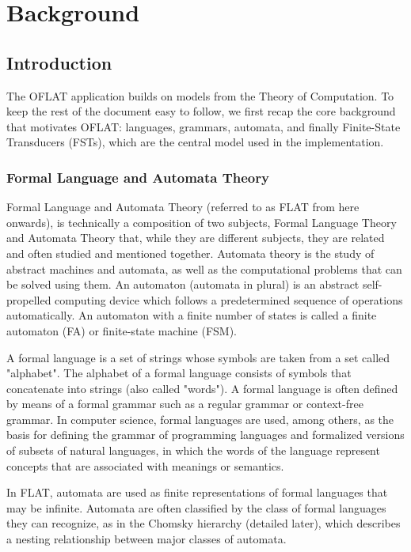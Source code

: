 %

\chapter{Background}
\label{cha:background}

\section{Introduction}

The OFLAT application builds on models from the Theory of Computation. To keep the rest of the document easy to follow, 
we first recap the core background that motivates OFLAT: languages, grammars, automata, and finally Finite-State Transducers (FSTs), 
which are the central model used in the implementation.

\subsection{Formal Language and Automata Theory}

Formal Language and Automata Theory (referred to as FLAT from here onwards), is technically a composition of two subjects, Formal Language Theory
and Automata Theory that, while they are different subjects, they are related and often studied and mentioned together.
Automata theory is the study of abstract machines and automata, as well as the computational problems that can be solved using them.
An automaton (automata in plural) is an abstract self-propelled computing device which follows a predetermined sequence of operations automatically. 
An automaton with a finite number of states is called a finite automaton (FA) or finite-state machine (FSM).

A formal language is a set of strings whose symbols are taken from a set called "alphabet".
The alphabet of a formal language consists of symbols that concatenate into strings (also called "words"). 
A formal language is often defined by means of a formal grammar such as a regular grammar or context-free grammar.
In computer science, formal languages are used, among others, as the basis for defining the grammar of programming languages and formalized versions of subsets of natural languages, 
in which the words of the language represent concepts that are associated with meanings or semantics. 

In FLAT, automata are used as finite representations of formal languages that may be infinite. 
Automata are often classified by the class of formal languages they can recognize, 
as in the Chomsky hierarchy (detailed later), which describes a nesting relationship between major classes of automata.

